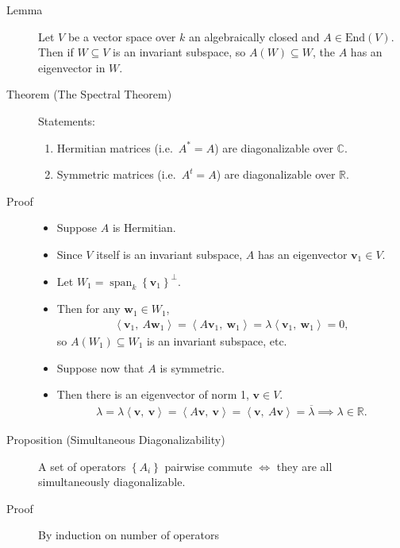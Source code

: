 \begin{description}
\item[Lemma]
Let \(V\) be a vector space over \(k\) an algebraically closed and
\(A \in \mathrm{End}(V)\). Then if \(W \subseteq V\) is an invariant
subspace, so \(A(W) \subseteq W\), the \(A\) has an eigenvector in
\(W\).
\item[Theorem (The Spectral Theorem)]
Statements:

\begin{enumerate}
\def\labelenumi{\arabic{enumi}.}
\tightlist
\item
  Hermitian matrices (i.e.~\(A^* = A\)) are diagonalizable over
  \({\mathbb{C}}\).
\item
  Symmetric matrices (i.e.~\(A^t = A\)) are diagonalizable over
  \({\mathbb{R}}\).
\end{enumerate}
\item[Proof]
\hfill

\begin{itemize}
\item
  Suppose \(A\) is Hermitian.
\item
  Since \(V\) itself is an invariant subspace, \(A\) has an eigenvector
  \(\mathbf{v}_1 \in V\).
\item
  Let
  \(W_1 = {\operatorname{span}}_k\left\{{\mathbf{v}_1}\right\}^\perp\).
\item
  Then for any \(\mathbf{w}_1 \in W_1\),
  \begin{align*}
  {\left\langle {\mathbf{v}_1},~{ A \mathbf{w}_1} \right\rangle} =
  {\left\langle {A \mathbf{v}_1},~{\mathbf{w}_1} \right\rangle} =
  \lambda {\left\langle {\mathbf{v}_1},~{\mathbf{w}_1} \right\rangle} = 0,
  \end{align*}
  so \(A(W_1) \subseteq W_1\) is an invariant subspace, etc.
\item
  Suppose now that \(A\) is symmetric.
\item
  Then there is an eigenvector of norm 1, \(\mathbf{v} \in V\).
  \begin{align*}     \lambda = \lambda{\left\langle {\mathbf{v}},~{\mathbf{v}} \right\rangle} = {\left\langle {A\mathbf{v}},~{\mathbf{v}} \right\rangle} = {\left\langle {\mathbf{v}},~{A\mathbf{v}} \right\rangle} = \overline{\lambda} \implies \lambda \in {\mathbb{R}}     .\end{align*}
\end{itemize}
\item[Proposition (Simultaneous Diagonalizability)]
A set of operators \(\left\{{A_i}\right\}\) pairwise commute \(\iff\)
they are all simultaneously diagonalizable.
\item[Proof]
By induction on number of operators


\end{description}
